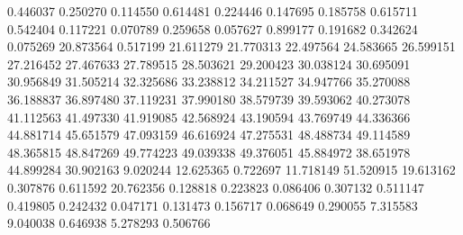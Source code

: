 0.446037
0.250270
0.114550
0.614481
0.224446
0.147695
0.185758
0.615711
0.542404
0.117221
0.070789
0.259658
0.057627
0.899177
0.191682
0.342624
0.075269
20.873564
0.517199
21.611279
21.770313
22.497564
24.583665
26.599151
27.216452
27.467633
27.789515
28.503621
29.200423
30.038124
30.695091
30.956849
31.505214
32.325686
33.238812
34.211527
34.947766
35.270088
36.188837
36.897480
37.119231
37.990180
38.579739
39.593062
40.273078
41.112563
41.497330
41.919085
42.568924
43.190594
43.769749
44.336366
44.881714
45.651579
47.093159
46.616924
47.275531
48.488734
49.114589
48.365815
48.847269
49.774223
49.039338
49.376051
45.884972
38.651978
44.899284
30.902163
9.020244
12.625365
0.722697
11.718149
51.520915
19.613162
0.307876
0.611592
20.762356
0.128818
0.223823
0.086406
0.307132
0.511147
0.419805
0.242432
0.047171
0.131473
0.156717
0.068649
0.290055
7.315583
9.040038
0.646938
5.278293
0.506766
